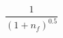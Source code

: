 \documentclass[12pt]{article}
\begin{document}
\begin{displaymath}
\frac{1}{(1+n_f)^{0.5}}
\end{displaymath}
\end{document}
